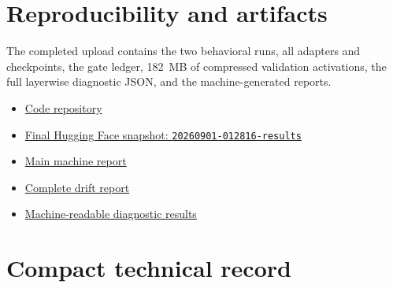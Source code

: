 \documentclass[11pt]{article}
\newcommand{\code}[1]{\texttt{#1}}
\begin{document}
\section{Reproducibility and artifacts}

The completed upload contains the two behavioral runs, all adapters and checkpoints,
the gate ledger, 182~MB of compressed validation activations, the full layerwise
diagnostic JSON, and the machine-generated reports.

\begin{itemize}
  \item \href{https://github.com/anthnguyen/chipmunk}{Code repository}
  \item \href{https://huggingface.co/datasets/metametal/chipmunk-results/tree/main/20260901-012816-results}{Final Hugging Face snapshot: \code{20260901-012816-results}}
  \item \href{https://huggingface.co/datasets/metametal/chipmunk-results/blob/main/20260901-012816-results/runs/Qwen2.5-7B-Instruct-clinical-v4-diagnostic-collection-01/REPORT.md}{Main machine report}
  \item \href{https://huggingface.co/datasets/metametal/chipmunk-results/blob/main/20260901-012816-results/runs/Qwen2.5-7B-Instruct-clinical-v4-diagnostic-collection-01/exploratory_drift/EXPLORATORY_DRIFT.md}{Complete drift report}
  \item \href{https://huggingface.co/datasets/metametal/chipmunk-results/blob/main/20260901-012816-results/runs/Qwen2.5-7B-Instruct-clinical-v4-diagnostic-collection-01/exploratory_drift/exploratory_drift.json}{Machine-readable diagnostic results}
\end{itemize}

\appendix
\section{Compact technical record}
\end{document}
